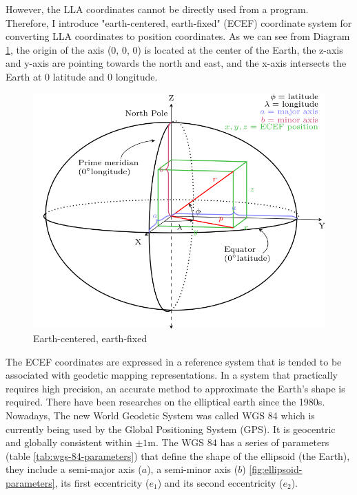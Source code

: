 However, the LLA coordinates cannot be directly used from a program. Therefore, I introduce "earth-centered, earth-fixed" (ECEF) coordinate system for converting LLA coordinates to position coordinates. As we can see from Diagram \ref{fig:ecef}, the origin of the axis (0, 0, 0) is located at the center of the Earth, the z-axis and y-axis are pointing towards the north and east, and the x-axis intersects the Earth at $0$ latitude and $0$ longitude.

\begin{figure}[H]
\caption[ECEF]{Earth-centered, earth-fixed \cite{wiki.ecef.2016}}
\label{fig:ecef}
\centering
\includegraphics[width=\linewidth]{Figures/ecef.png}
\decoRule
\end{figure}

The ECEF coordinates are expressed in a reference system that is tended to be associated with geodetic mapping representations. In a system that practically requires high precision,  an accurate method to approximate the Earth’s shape is required. There have been researches on the elliptical earth since the 1980s. Nowadays, The new World Geodetic System was called WGS 84 which is currently being used by the Global Positioning System (GPS). It is geocentric and globally consistent within $\pm{1}$m. The WGS 84 has a series of parameters (table \ref{tab:wgs-84-parameters}) that define the shape of the ellipsoid (the Earth), they include a semi-major axis ($a$), a semi-minor axis ($b$) \ref{fig:ellipsoid-parameters}, its first eccentricity ($e_1$) and its second eccentricity ($e_2$).

